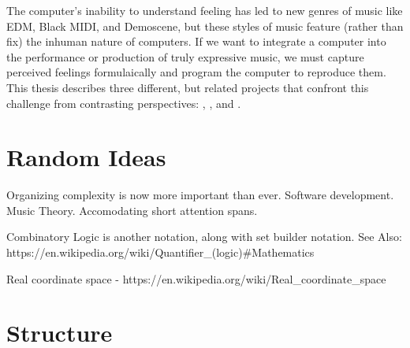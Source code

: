 The computer's inability to understand feeling has led to new genres
of music like EDM, Black
MIDI, and Demoscene, but these styles of music
feature (rather than fix) the inhuman nature of computers. If we want
to integrate a computer into the performance or production of truly
expressive music, we must capture perceived feelings formulaically
and program the computer to reproduce them. This thesis describes
three different, but related projects that confront this challenge from
contrasting perspectives: , \polytempic, and \thesis.

\section{Random Ideas}
\label{sec:random-ideas}

Organizing complexity is now more important than ever. Software
development. Music Theory. Accomodating short attention spans.

Combinatory Logic is another notation, along with set builder
notation. See Also:
https://en.wikipedia.org/wiki/Quantifier_(logic)#Mathematics

Real coordinate space  - https://en.wikipedia.org/wiki/Real_coordinate_space


\section{Structure}
\label{sec:structure}

